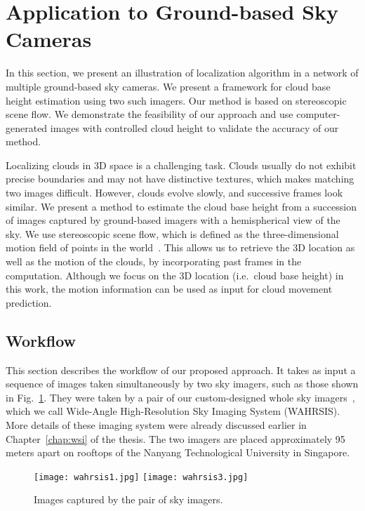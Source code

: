 \section{Application to Ground-based Sky Cameras} 
\label{sec:chap8-cloudheight}
In this section, we present an illustration of localization algorithm in a network of multiple ground-based sky cameras. We present a framework for cloud base height estimation using two such imagers. Our method is based on stereoscopic scene flow. We demonstrate the feasibility of our approach and use computer-generated images with controlled cloud height to validate the accuracy of our method.

Localizing clouds in 3D space is a challenging task. Clouds usually do not exhibit precise boundaries and may not have distinctive textures, which makes matching two images difficult. However, clouds evolve slowly, and successive frames look similar. We present a method to estimate the cloud base height from a succession of images captured by ground-based imagers with a hemispherical view of the sky. We use stereoscopic scene flow, which is defined as the three-dimensional motion field of points in the world~\cite{vedula1999three}. This allows us to retrieve the 3D location as well as the motion of the clouds, by incorporating past frames in the computation. Although we focus on the 3D location (i.e.\ cloud base height) in this work, the motion information can be used as input for cloud movement prediction. 

\subsection{Workflow}
This section describes the workflow of our proposed approach. It takes as input a sequence of images taken simultaneously by two sky imagers, such as those shown in Fig.~\ref{fig:wahrsis-pictures}. They were taken by a pair of our custom-designed whole sky imagers~\cite{WAHRSIS,IGARSS2015a}, which we call Wide-Angle High-Resolution Sky Imaging System (WAHRSIS). More details of these imaging system were already discussed earlier in Chapter~\ref{chap:wsi} of the thesis. The two imagers are placed approximately 95 meters apart on rooftops of the Nanyang Technological University in Singapore.

\begin{figure}[htb]
\centering
\texttt{[image: wahrsis1.jpg]}
\texttt{[image: wahrsis3.jpg]}
\caption{Images captured by the pair of sky imagers.}\label{fig:wahrsis-pictures}
\end{figure}

